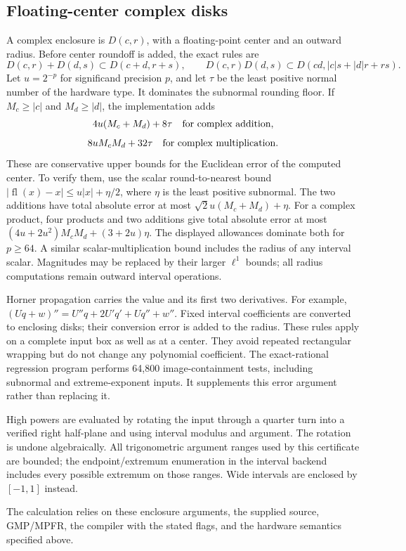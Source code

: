 \documentclass[11pt,a4paper]{article}
\begin{document}
\subsection{Floating-center complex disks}
A complex enclosure is $D(c,r)$, with a floating-point center and an outward
radius. Before center roundoff is added, the exact rules are
\[
 D(c,r)+D(d,s)\subset D(c+d,r+s),\qquad
 D(c,r)D(d,s)\subset D(cd,|c|s+|d|r+rs).
\]
Let $u=2^{-p}$ for significand precision $p$, and let $\tau$ be the least
positive normal number of the hardware type. It dominates the subnormal
rounding floor. If $M_c\ge|c|$ and $M_d\ge|d|$, the implementation adds
\[
 4u(M_c+M_d)+8\tau\quad\hbox{for complex addition},
\]
\[
 8uM_cM_d+32\tau\quad\hbox{for complex multiplication}.
\]
These are conservative upper bounds for the Euclidean error of the computed
center. To verify them, use the scalar round-to-nearest bound
$|\operatorname{fl}(x)-x|\le u|x|+\eta/2$, where $\eta$ is the least positive
subnormal. The two additions have total absolute error at most
$\sqrt2u(M_c+M_d)+\eta$. For a complex product, four products and two additions
give total absolute error at most
$(4u+2u^2)M_cM_d+(3+2u)\eta$. The displayed allowances dominate both for $p\ge64$.
A similar scalar-multiplication bound includes the radius of any interval
scalar. Magnitudes may be replaced by their larger $\ell^1$ bounds; all
radius computations remain outward interval operations.

Horner propagation carries the value and its first two derivatives. For
example, $(Uq+w)''=U''q+2U'q'+Uq''+w''$. Fixed interval coefficients are
converted to enclosing disks; their conversion error is added to the radius.
These rules apply on a complete input box as well as at a center. They avoid
repeated rectangular wrapping but do not change any polynomial coefficient.
The exact-rational regression program performs 64,800 image-containment tests,
including subnormal and extreme-exponent inputs. It supplements this error
argument rather than replacing it.

High powers are evaluated by rotating the input through a quarter turn into
a verified right half-plane and using interval modulus and argument. The
rotation is undone algebraically. All trigonometric argument ranges used by
this certificate are bounded; the endpoint/extremum enumeration in the
interval backend includes every possible extremum on those ranges. Wide
intervals are enclosed by $[-1,1]$ instead.

The calculation relies on these enclosure arguments, the supplied source,
GMP/MPFR, the compiler with the stated flags, and the hardware semantics
specified above.
\end{document}
